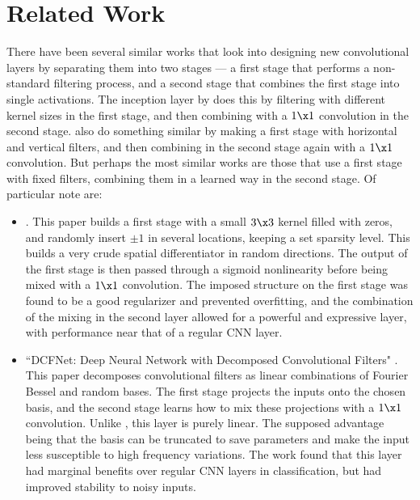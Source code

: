 \section{Related Work}\label{sec:ch5:related}

There have been several similar works that look into designing new convolutional
layers by separating them into two stages --- a first stage that performs a
non-standard filtering process, and a second stage that combines the first stage
into single activations. The inception layer 
\cite{szegedy_rethinking_2015} by \citeauthor*{szegedy_rethinking_2015} does this by filtering with different
kernel sizes in the first stage, and then combining with a $1\x 1$ convolution
in the second stage. \citeauthor*{ioannou_training_2015} also do something similar by making
a first stage with horizontal and vertical filters, and then combining in the
second stage again with a $1\x 1$ convolution\cite{ioannou_training_2015}. But perhaps the most similar
works are those that use a first stage with fixed filters, combining them in a
learned way in the second stage. Of particular note are:
\begin{itemize}
\item 
{} \cite{juefei-xu_local_2016}. This paper builds a
first stage with a small $3\x 3$ kernel filled with zeros, and randomly insert
$\pm 1$ in several locations, keeping a set sparsity level. This builds a very
crude spatial differentiator in random directions. The output of the first stage
is then passed through a sigmoid nonlinearity before being mixed with a $1\x 1$
convolution. The imposed structure on the first stage was found to be a good
regularizer and prevented overfitting, and the combination of the mixing in the
second layer allowed for a powerful and expressive layer, with performance near
that of a regular CNN layer.

\item
``DCFNet: Deep Neural Network with Decomposed Convolutional Filters"
\cite{qiu_dcfnet:_2018}. This paper decomposes convolutional filters as linear
combinations of Fourier Bessel and random bases.  The first stage projects the
inputs onto the chosen basis, and the second stage learns how to mix these
projections with a $1\x 1$ convolution. Unlike \cite{juefei-xu_local_2016}, this
layer is purely linear. The supposed advantage being that the
basis can be truncated to save parameters and make the input less susceptible to
high frequency variations. The work found that this layer had marginal benefits
over regular CNN layers in classification, but had improved stability to noisy
inputs. 

\end{itemize}

